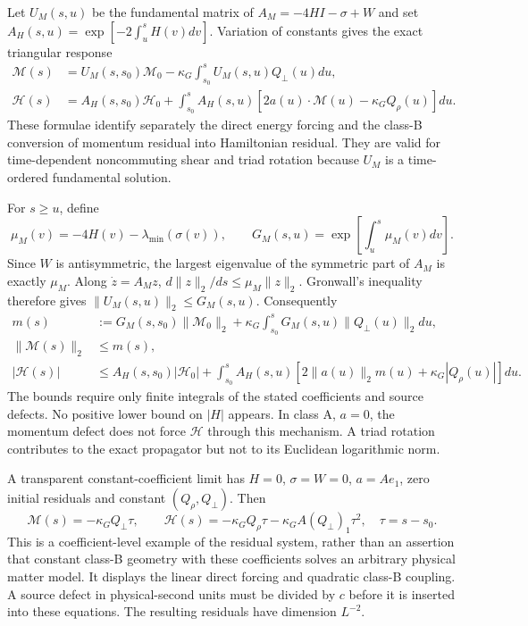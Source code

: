 Let $U_M(s,u)$ be the fundamental matrix of
$A_M=-4HI-\sigma+W$ and set
$A_H(s,u)=\exp[-2\int_u^sH(v)dv]$. Variation of constants gives the exact triangular response
\begin{align}
 \mathscr M(s)&=U_M(s,s_0)\mathscr M_0
       -\kappa_G\int_{s_0}^{s}U_M(s,u)Q_\perp(u)du,
 \label{geo:forced_momentum}\\
 \mathscr H(s)&=A_H(s,s_0)\mathscr H_0
       +\int_{s_0}^{s}A_H(s,u)
          [2a(u)\cdot\mathscr M(u)-\kappa_GQ_\rho(u)]du.
 \label{geo:forced_hamiltonian}
\end{align}
These formulae identify separately the direct energy forcing and the class-B conversion of momentum residual into Hamiltonian residual. They are valid for time-dependent noncommuting shear and triad rotation because $U_M$ is a time-ordered fundamental solution.

For $s\ge u$, define
\begin{equation}
 \mu_M(v)=-4H(v)-\lambda_{\min}(\sigma(v)),\qquad
 G_M(s,u)=\exp\!\left[\int_u^s\mu_M(v)dv\right].
 \label{geo:lognorm}
\end{equation}
Since $W$ is antisymmetric, the largest eigenvalue of the symmetric part of $A_M$ is exactly $\mu_M$. Along $\dot z=A_Mz$,
$d\|z\|_2/ds\le\mu_M\|z\|_2$. Gronwall's inequality therefore gives $\|U_M(s,u)\|_2\le G_M(s,u)$. Consequently
\begin{align}
 m(s)&:=G_M(s,s_0)\|\mathscr M_0\|_2
   +\kappa_G\int_{s_0}^{s}G_M(s,u)\|Q_\perp(u)\|_2du,
 \nonumber\\[-1mm]
 \|\mathscr M(s)\|_2&\le m(s),
 \label{geo:momentum_bound}\\
 |\mathscr H(s)|&\le A_H(s,s_0)|\mathscr H_0|
 +\int_{s_0}^{s}A_H(s,u)
       [2\|a(u)\|_2m(u)+\kappa_G|Q_\rho(u)|]du.
 \label{geo:hamiltonian_bound}
\end{align}
The bounds require only finite integrals of the stated coefficients and source defects. No positive lower bound on $|H|$ appears. In class A, $a=0$, the momentum defect does not force $\mathscr H$ through this mechanism. A triad rotation contributes to the exact propagator but not to its Euclidean logarithmic norm.

A transparent constant-coefficient limit has $H=0$, $\sigma=W=0$, $a=Ae_1$, zero initial residuals and constant $(Q_\rho,Q_\perp)$. Then
\begin{equation}
 \mathscr M(s)=-\kappa_GQ_\perp\tau,\qquad
 \mathscr H(s)=-\kappa_GQ_\rho\tau
              -\kappa_GA(Q_\perp)_1\tau^2,
 \quad \tau=s-s_0.
 \label{geo:forced_example}
\end{equation}
This is a coefficient-level example of the residual system, rather than an assertion that constant class-B geometry with these coefficients solves an arbitrary physical matter model. It displays the linear direct forcing and quadratic class-B coupling. A source defect in physical-second units must be divided by $c$ before it is inserted into these equations. The resulting residuals have dimension $L^{-2}$.

